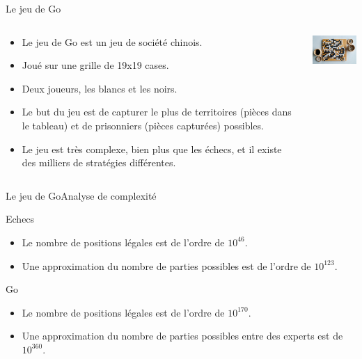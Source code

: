 \begin{frame}{Le jeu de Go}
    \begin{block}{}
        \begin{columns}
            \begin{column}{8cm}
                \begin{itemize}
                    \item Le jeu de Go est un jeu de société chinois.
                    \item Joué sur une grille de 19x19 cases.
                    \item Deux joueurs, les blancs et les noirs.
                    \item Le but du jeu est de capturer le plus de territoires (pièces dans le tableau) et de prisonniers (pièces capturées) possibles.
                    \item Le jeu est très complexe, bien plus que les échecs, et il existe des milliers de stratégies différentes.
                \end{itemize}
            \end{column}
            \begin{column}{3cm}
                \includegraphics[width=3cm]{ressources/Go/Go_tableau}
            \end{column}
        \end{columns}
    \end{block}
\end{frame}


\begin{frame}{Le jeu de Go}{Analyse de complexité}
    \begin{block}{Echecs}
        \begin{itemize}
            \item Le nombre de positions légales est de l'ordre de $10^{46}$.
            \item Une approximation du nombre de parties possibles est de l'ordre de $10^{123}$.
        \end{itemize}
    \end{block}
    \pause
    \begin{alertblock}{Go}
        \begin{itemize}
            \item Le nombre de positions légales est de l'ordre de $10^{170}$.
            \item Une approximation du nombre de parties possibles entre des experts est de $10^{360}$.
        \end{itemize}
    \end{alertblock}
\end{frame}


